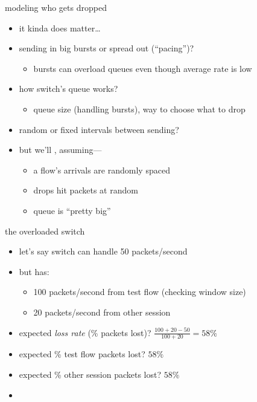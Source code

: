 \begin{frame}{modeling who gets dropped}
    \begin{itemize}
    \item it kinda does matter\ldots
    \item sending in big bursts or spread out (``pacing'')?
        \begin{itemize}
        \item bursts can overload queues even though average rate is low
        \end{itemize}
    \item how switch's queue works?
        \begin{itemize}
        \item queue size (handling bursts), way to choose what to drop
        \end{itemize}
    \item random or fixed intervals between sending?
    \vspace{.5cm}
    \item<2-> but we'll , assuming---
        \begin{itemize}
        \item a flow's arrivals are randomly spaced
        \item drops hit packets at random
        \item queue is ``pretty big''
        \end{itemize}
    \end{itemize}
\end{frame}

\begin{frame}{the overloaded switch}
\begin{itemize}
\item let's say switch can handle 50 packets/second
\item but has:
    \begin{itemize}
    \item 100 packets/second from test flow (checking window size) 
    \item 20 packets/second from other session
    \end{itemize}
\item expected \textit{loss rate} (\% packets lost)? $\frac{100+20-50}{100+20}=58\%$
\item expected \% test flow packets lost? $58\%$
\item expected \% other session packets lost? $58\%$
\item<2-> 
\end{itemize}
\end{frame}

